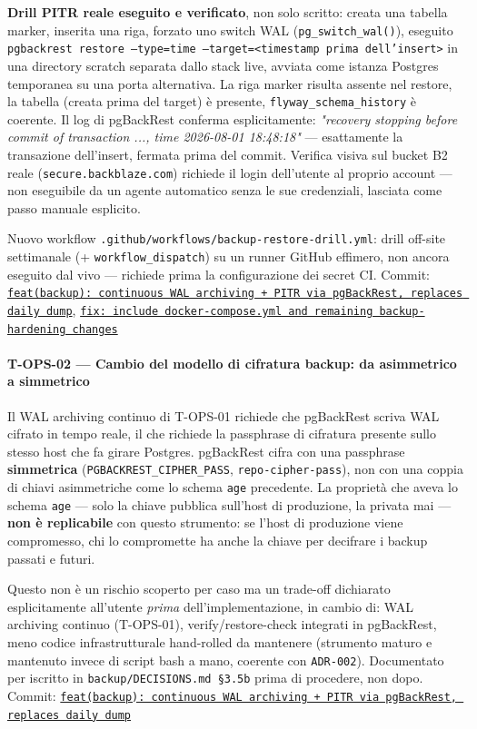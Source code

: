 ﻿\documentclass[a4paper,12pt]{report}
\newcommand{\commitref}[2]{\texttt{\small \href{https://github.com/diegoandruccioli/hotel-pms/commit/#1}{#2}}}
\begin{document}
\textbf{Drill PITR reale eseguito e verificato}, non solo scritto: creata
una tabella marker, inserita una riga, forzato uno switch WAL
(\texttt{pg\_switch\_wal()}), eseguito
\texttt{pgbackrest restore --type=time --target=<timestamp prima
dell'insert>} in una directory scratch separata dallo stack live, avviata
come istanza Postgres temporanea su una porta alternativa. La riga
marker risulta assente nel restore, la tabella (creata prima del target)
è presente, \texttt{flyway\_schema\_history} è coerente. Il log di
pgBackRest conferma esplicitamente:
\emph{"recovery stopping before commit of transaction ..., time
2026-08-01 18:48:18"} --- esattamente la transazione dell'insert,
fermata prima del commit. Verifica visiva sul bucket B2 reale
(\texttt{secure.backblaze.com}) richiede il login dell'utente al proprio
account --- non eseguibile da un agente automatico senza le sue
credenziali, lasciata come passo manuale esplicito.

Nuovo workflow \texttt{.github/workflows/backup-restore-drill.yml}: drill
off-site settimanale (+ \texttt{workflow\_dispatch}) su un runner GitHub
effimero, non ancora eseguito dal vivo --- richiede prima la
configurazione dei secret CI.
Commit: \commitref{48828ad}{feat(backup): continuous WAL archiving + PITR via pgBackRest, replaces daily dump}, \commitref{663a0bf}{fix: include docker-compose.yml and remaining backup-hardening changes}

\paragraph{T-OPS-02 --- Cambio del modello di cifratura backup: da asimmetrico a simmetrico}
Il WAL archiving continuo di T-OPS-01 richiede che pgBackRest scriva WAL
cifrato in tempo reale, il che richiede la passphrase di cifratura
presente sullo stesso host che fa girare Postgres. pgBackRest cifra con
una passphrase \textbf{simmetrica} (\texttt{PGBACKREST\_CIPHER\_PASS},
\texttt{repo-cipher-pass}), non con una coppia di chiavi asimmetriche
come lo schema \texttt{age} precedente. La proprietà che aveva lo schema
\texttt{age} --- solo la chiave pubblica sull'host di produzione, la
privata mai --- \textbf{non è replicabile} con questo strumento: se
l'host di produzione viene compromesso, chi lo compromette ha anche la
chiave per decifrare i backup passati e futuri.

Questo non è un rischio scoperto per caso ma un trade-off dichiarato
esplicitamente all'utente \emph{prima} dell'implementazione, in cambio
di: WAL archiving continuo (T-OPS-01), verify/restore-check integrati in
pgBackRest, meno codice infrastrutturale hand-rolled da mantenere
(strumento maturo e mantenuto invece di script bash a mano, coerente con
\texttt{ADR-002}). Documentato per iscritto in
\texttt{backup/DECISIONS.md~\S3.5b} prima di procedere, non dopo.
Commit: \commitref{48828ad}{feat(backup): continuous WAL archiving + PITR via pgBackRest, replaces daily dump}
\end{document}
